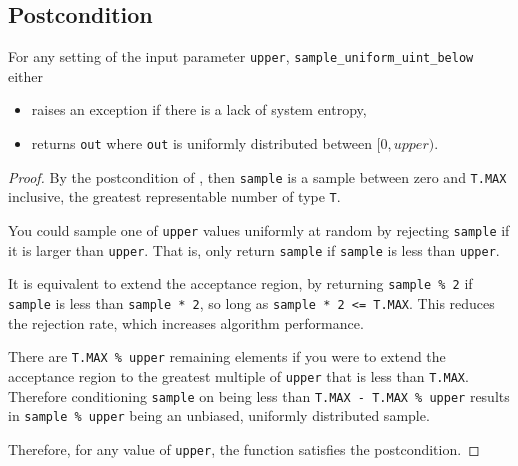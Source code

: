 \documentclass{article}
\begin{document}


\subsection*{Postcondition}
\begin{theorem}
For any setting of the input parameter \texttt{upper},
\texttt{sample\_uniform\_uint\_below} either
\begin{itemize}
    \item raises an exception if there is a lack of system entropy,
    \item returns \texttt{out} where \texttt{out} is uniformly distributed between $[0, upper)$.
\end{itemize}
\end{theorem}
\begin{proof}
\label{unsigned-integer-proof}
By the postcondition of ,
then \texttt{sample} is a sample between zero and \texttt{T.MAX} inclusive, the greatest representable number of type \texttt{T}.

You could sample one of \texttt{upper} values uniformly at random by rejecting \texttt{sample} if it is larger than \texttt{upper}.
That is, only return \texttt{sample} if \texttt{sample} is less than \texttt{upper}.

It is equivalent to extend the acceptance region,
by returning \texttt{sample \% 2} if \texttt{sample} is less than \texttt{sample * 2},
so long as \texttt{sample * 2 <= T.MAX}.
This reduces the rejection rate, which increases algorithm performance.

There are \texttt{T.MAX \% upper} remaining elements if you were to
extend the acceptance region to the greatest multiple of \texttt{upper} that is less than \texttt{T.MAX}.
Therefore conditioning \texttt{sample} on being less than \texttt{T.MAX - T.MAX \% upper}
results in \texttt{sample \% upper} being an unbiased, uniformly distributed sample.

\noindent Therefore, for any value of \texttt{upper}, the function satisfies the postcondition.
\end{proof}
\end{document}
